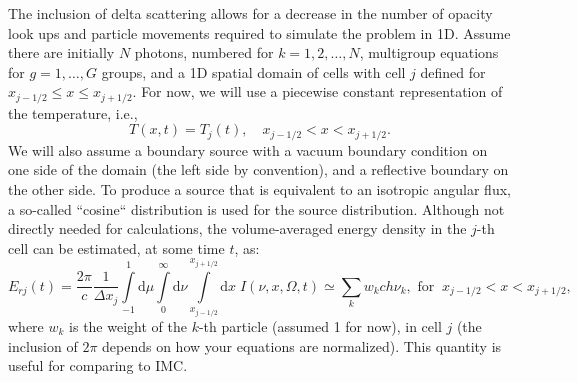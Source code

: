 \documentclass{article}
\renewcommand{\d}{\mathrm{d}}
\newcommand{\xl}{{x_{j-1/2}}}
\newcommand{\xr}{{x_{j+1/2}}}
\begin{document}
The inclusion of delta scattering allows for a decrease in the number of opacity
look ups and particle movements required to simulate the problem in 1D. Assume
there are initially $N$ photons, numbered for $k=1,2,\ldots,N$, multigroup equations for
$g=1,\ldots,G$ groups, and a 1D spatial domain of cells with cell $j$ defined
for $\xl \leq x \leq \xr$.  For now, we will use a piecewise constant representation of the temperature, i.e.,
\begin{equation}
 T(x,t) = T_j(t), \quad \xl < x < \xr.
\end{equation}
We will also assume a boundary source with a vacuum boundary condition on one
side of the domain (the left side by convention), and a reflective boundary on
the other side.  To produce a source that is equivalent to an isotropic angular
flux, a so-called ``cosine`` distribution is used for the source distribution.
 Although not directly needed for calculations, the volume-averaged energy density in the $j$-th cell can be estimated, at some time
$t$, as:
\begin{equation}
 E_{rj}(t) = \frac{2\pi}{c} \frac{1}{\Delta x_j} \int\limits_{-1}^1 \d \mu \int\limits_0^\infty \d \nu \int\limits_\xl^\xr \d x \; I(\nu,x,\Omega,t)  
		\simeq \sum_k w_k c h \nu_k, \text{ for} \;\;\xl < x < \xr,
\end{equation}
where $w_k$ is the weight of the $k$-th particle (assumed 1 for now), in cell
$j$ (the inclusion of $2\pi$ depends on how your equations are normalized). This
quantity is useful for comparing to IMC.
\end{document}
